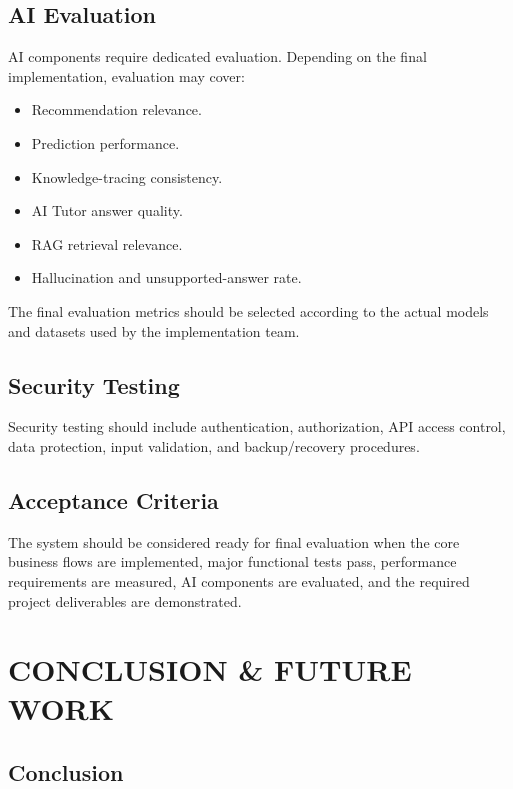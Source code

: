 \documentclass[12pt,a4paper]{report}
\begin{document}
\section{AI Evaluation}

AI components require dedicated evaluation. Depending on the final implementation, evaluation may cover:

\begin{itemize}
    \item Recommendation relevance.
    \item Prediction performance.
    \item Knowledge-tracing consistency.
    \item AI Tutor answer quality.
    \item RAG retrieval relevance.
    \item Hallucination and unsupported-answer rate.
\end{itemize}

The final evaluation metrics should be selected according to the actual models and datasets used by the implementation team.

\section{Security Testing}

Security testing should include authentication, authorization, API access control, data protection, input validation, and backup/recovery procedures.

\section{Acceptance Criteria}

The system should be considered ready for final evaluation when the core business flows are implemented, major functional tests pass, performance requirements are measured, AI components are evaluated, and the required project deliverables are demonstrated.

\chapter{CONCLUSION \& FUTURE WORK}

\section{Conclusion}
\end{document}
